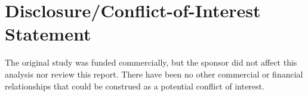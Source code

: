 \section*{Disclosure/Conflict-of-Interest Statement}
The original study was funded commercially, but the sponsor did not affect this analysis nor review this report. There have been no other commercial or financial relationships that could be construed as a potential conflict of interest. 